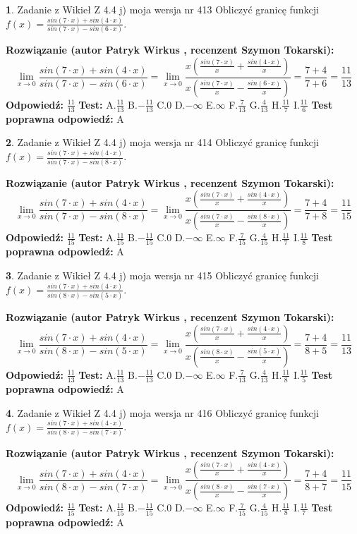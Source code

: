 \documentclass[12pt, a4paper]{article}
\theoremstyle{definition} %
\newtheorem{zad}{}
\newcommand{\zadStart}[1]{\begin{zad}#1\newline}
\newcommand{\zadStop}{\end{zad}}
\newcommand{\rozwStart}[2]{\noindent \textbf{Rozwiązanie (autor #1 , recenzent #2): }\newline}
\newcommand{\rozwStop}{\newline}
\newcommand{\odpStart}{\noindent \textbf{Odpowiedź:}\newline}
\newcommand{\odpStop}{\newline}
\newcommand{\testStart}{\noindent \textbf{Test:}\newline}
\newcommand{\testStop}{\newline}
\newcommand{\kluczStart}{\noindent \textbf{Test poprawna odpowiedź:}\newline}
\newcommand{\kluczStop}{\newline}
\begin{document}
\zadStart{Zadanie z Wikieł Z 4.4 j) moja wersja nr 413}
Obliczyć granicę funkcji $f(x)=\frac{sin(7\cdot x) +sin(4\cdot x)}{sin(7\cdot x) -sin(6\cdot x)}$.
\zadStop
\rozwStart{Patryk Wirkus}{Szymon Tokarski}
$$\lim\limits_{x\to 0}\frac{sin(7\cdot x) +sin(4\cdot x)}{sin(7\cdot x) -sin(6\cdot x)}=\lim\limits_{x\to 0}\frac{x(\frac{sin(7\cdot x)}{x}+\frac{sin(4\cdot x)}{x})}{x(\frac{sin(7\cdot x)}{x}-\frac{sin(6\cdot x)}{x})}=\frac{7+4}{7+6} = \frac{11}{13}$$
\rozwStop
\odpStart
$\frac{11}{13}$
\odpStop
\testStart
A.$\frac{11}{13}$
B.$-\frac{11}{13}$
C.$0$
D.$-\infty$
E.$\infty$
F.$\frac{7}{13}$
G.$\frac{4}{13}$
H.$\frac{11}{7}$
I.$\frac{11}{6}$
\testStop
\kluczStart
A
\kluczStop



\zadStart{Zadanie z Wikieł Z 4.4 j) moja wersja nr 414}
Obliczyć granicę funkcji $f(x)=\frac{sin(7\cdot x) +sin(4\cdot x)}{sin(7\cdot x) -sin(8\cdot x)}$.
\zadStop
\rozwStart{Patryk Wirkus}{Szymon Tokarski}
$$\lim\limits_{x\to 0}\frac{sin(7\cdot x) +sin(4\cdot x)}{sin(7\cdot x) -sin(8\cdot x)}=\lim\limits_{x\to 0}\frac{x(\frac{sin(7\cdot x)}{x}+\frac{sin(4\cdot x)}{x})}{x(\frac{sin(7\cdot x)}{x}-\frac{sin(8\cdot x)}{x})}=\frac{7+4}{7+8} = \frac{11}{15}$$
\rozwStop
\odpStart
$\frac{11}{15}$
\odpStop
\testStart
A.$\frac{11}{15}$
B.$-\frac{11}{15}$
C.$0$
D.$-\infty$
E.$\infty$
F.$\frac{7}{15}$
G.$\frac{4}{15}$
H.$\frac{11}{7}$
I.$\frac{11}{8}$
\testStop
\kluczStart
A
\kluczStop



\zadStart{Zadanie z Wikieł Z 4.4 j) moja wersja nr 415}
Obliczyć granicę funkcji $f(x)=\frac{sin(7\cdot x) +sin(4\cdot x)}{sin(8\cdot x) -sin(5\cdot x)}$.
\zadStop
\rozwStart{Patryk Wirkus}{Szymon Tokarski}
$$\lim\limits_{x\to 0}\frac{sin(7\cdot x) +sin(4\cdot x)}{sin(8\cdot x) -sin(5\cdot x)}=\lim\limits_{x\to 0}\frac{x(\frac{sin(7\cdot x)}{x}+\frac{sin(4\cdot x)}{x})}{x(\frac{sin(8\cdot x)}{x}-\frac{sin(5\cdot x)}{x})}=\frac{7+4}{8+5} = \frac{11}{13}$$
\rozwStop
\odpStart
$\frac{11}{13}$
\odpStop
\testStart
A.$\frac{11}{13}$
B.$-\frac{11}{13}$
C.$0$
D.$-\infty$
E.$\infty$
F.$\frac{7}{13}$
G.$\frac{4}{13}$
H.$\frac{11}{8}$
I.$\frac{11}{5}$
\testStop
\kluczStart
A
\kluczStop



\zadStart{Zadanie z Wikieł Z 4.4 j) moja wersja nr 416}
Obliczyć granicę funkcji $f(x)=\frac{sin(7\cdot x) +sin(4\cdot x)}{sin(8\cdot x) -sin(7\cdot x)}$.
\zadStop
\rozwStart{Patryk Wirkus}{Szymon Tokarski}
$$\lim\limits_{x\to 0}\frac{sin(7\cdot x) +sin(4\cdot x)}{sin(8\cdot x) -sin(7\cdot x)}=\lim\limits_{x\to 0}\frac{x(\frac{sin(7\cdot x)}{x}+\frac{sin(4\cdot x)}{x})}{x(\frac{sin(8\cdot x)}{x}-\frac{sin(7\cdot x)}{x})}=\frac{7+4}{8+7} = \frac{11}{15}$$
\rozwStop
\odpStart
$\frac{11}{15}$
\odpStop
\testStart
A.$\frac{11}{15}$
B.$-\frac{11}{15}$
C.$0$
D.$-\infty$
E.$\infty$
F.$\frac{7}{15}$
G.$\frac{4}{15}$
H.$\frac{11}{8}$
I.$\frac{11}{7}$
\testStop
\kluczStart
A
\kluczStop
\end{document}

